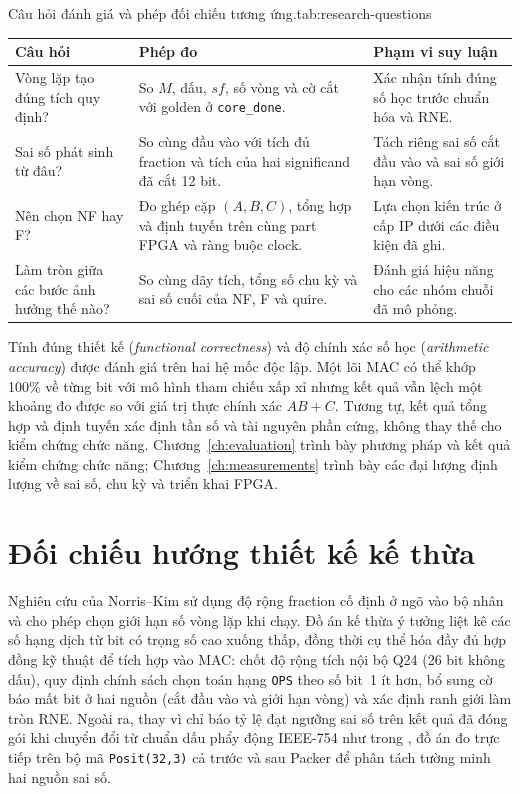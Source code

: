 \begin{engineeringtable}{Câu hỏi đánh giá và phép đối chiếu tương ứng.}{tab:research-questions}
\begin{tabularx}{\linewidth}{@{}>{\raggedright\arraybackslash}p{42mm}Y Y@{}}
\toprule
Câu hỏi & Phép đo & Phạm vi suy luận \\
\midrule
Vòng lặp tạo đúng tích quy định? & So $M$, dấu, $sf$, số vòng và cờ cắt với golden ở \texttt{core\_done}. & Xác nhận tính đúng số học trước chuẩn hóa và RNE. \\
Sai số phát sinh từ đâu? & So cùng đầu vào với tích đủ fraction và tích của hai significand đã cắt 12 bit. & Tách riêng sai số cắt đầu vào và sai số giới hạn vòng. \\
Nên chọn NF hay F? & Đo ghép cặp $(A,B,C)$, tổng hợp và định tuyến trên cùng part FPGA và ràng buộc clock. & Lựa chọn kiến trúc ở cấp IP dưới các điều kiện đã ghi. \\
Làm tròn giữa các bước ảnh hưởng thế nào? & So cùng dãy tích, tổng số chu kỳ và sai số cuối của NF, F và quire. & Đánh giá hiệu năng cho các nhóm chuỗi đã mô phỏng. \\
\bottomrule
\end{tabularx}
\end{engineeringtable}

Tính đúng thiết kế (\textit{functional correctness}) và độ chính xác số học
(\textit{arithmetic accuracy}) được đánh giá trên hai hệ mốc độc lập. Một lõi
MAC có thể khớp 100\% về từng bit với mô hình tham chiếu xấp xỉ nhưng kết quả
vẫn lệch một khoảng đo được so với giá trị thực chính xác $AB+C$. Tương tự, kết
quả tổng hợp và định tuyến xác định tần số và tài nguyên phần cứng, không thay
thế cho kiểm chứng chức năng. Chương~\ref{ch:evaluation} trình bày phương pháp
và kết quả kiểm chứng chức năng; Chương~\ref{ch:measurements} trình bày các đại
lượng định lượng về sai số, chu kỳ và triển khai FPGA.

\section{Đối chiếu hướng thiết kế kế thừa}

Nghiên cứu của Norris--Kim sử dụng độ rộng fraction cố định ở ngõ vào bộ nhân và
cho phép chọn giới hạn số vòng lặp khi chạy. Đồ án kế thừa ý tưởng liệt kê các số
hạng dịch từ bit có trọng số cao xuống thấp, đồng thời cụ thể hóa đầy đủ hợp đồng
kỹ thuật để tích hợp vào MAC: chốt độ rộng tích nội bộ Q24 (26 bit không dấu),
quy định chính sách chọn toán hạng \texttt{OPS} theo số bit~1 ít hơn, bổ sung cờ
báo mất bit ở hai nguồn (cắt đầu vào và giới hạn vòng) và xác định ranh giới làm
tròn RNE. Ngoài ra, thay vì chỉ báo tỷ lệ đạt ngưỡng sai số trên kết quả đã đóng
gói khi chuyển đổi từ chuẩn dấu phẩy động IEEE-754 như trong \cite{norris2021iterativeposit},
đồ án đo trực tiếp trên bộ mã \texttt{Posit(32,3)} cả trước và sau Packer để
phân tách tường minh hai nguồn sai số.

